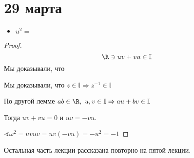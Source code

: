 \chapter{29 марта}

\begin{lemma}\itemize
	\begin{itemize}
		\item $u^2 = $
	\end{itemize}
	\?
\end{lemma}

\begin{proof}
	\[\R \ni uv + vu \in \mathbb{I}\]
	Мы доказывали, что \?

	Мы доказывали, что $z \in \mathbb{I} \Rightarrow z^{-1} \in \mathbb{I}$

	По другой лемме $ab \in \R,\ u, v \in \mathbb{I} \Rightarrow au + bv \in \mathbb{I}$

	Тогда $uv + vu = 0$ и $uv = -vu$.

	$\sphericalangle \omega^2 = uv uv = uv (-vu) = -u^2 = -1$
\end{proof}

Остальная часть лекции рассказана повторно на пятой лекции.
